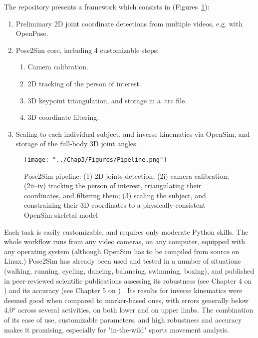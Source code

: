 The repository presents a framework which consists in (Figures~\ref{fig_pipeline}):
\begin{enumerate}[itemsep=-0.5em, topsep=0pt, leftmargin=*]
      \item Preliminary 2D joint coordinate detections from multiple videos, e.g. with OpenPose.
      \item Pose2Sim core, including 4 customizable steps:
      \begin{enumerate}[before=\vspace{-0.5\baselineskip}, nosep]
            \item Camera calibration.
            \item 2D tracking of the person of interest.
            \item 3D keypoint triangulation, and storage in a .trc file.
            \item 3D coordinate filtering.
      \end{enumerate}
      \item Scaling to each individual subject, and inverse kinematics via OpenSim, and storage of the full-body 3D joint angles.
\end{enumerate}

\begin{figure}[hbtp]
	\centering
	\def\svgwidth{1\columnwidth}
	\fontsize{10pt}{10pt}\selectfont
	\texttt{[image: "../Chap3/Figures/Pipeline.png"]}
	\caption{Pose2Sim pipeline: (1) 2D joints detection; (2i) camera calibration; (2ii–iv) tracking the person of interest, triangulating their coordinates, and filtering them; (3) scaling the subject, and constraining their 3D coordinates to a physically consistent OpenSim skeletal model}
	\label{fig_pipeline}
\end{figure}
\FloatBarrier

Each task is easily customizable, and requires only moderate Python skills. The whole workflow runs from any video cameras, on any computer, equipped with any operating system (although OpenSim has to be compiled from source on Linux.) Pose2Sim has already been used and tested in a number of situations (walking, running, cycling, dancing, balancing, swimming, boxing), and published in peer-reviewed scientific publications assessing its robustness (see Chapter 4 on ) \cite{Pagnon2021} and its accuracy (see Chapter 5 on ) \cite{Pagnon2022}. Its results for inverse kinematics were deemed good when compared to marker-based ones, with errors generally below 4.0° across several activities, on both lower and on upper limbs. The combination of its ease of use, customizable parameters, and high robustness and accuracy makes it promising, especially for "in-the-wild" sports movement analysis.



